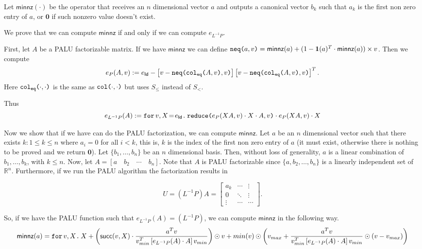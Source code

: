 Let $\mathsf{minnz}(\cdot)$ be the operator that receives an $n$ dimensional vector $a$ and outputs a canonical vector $b_k$ such that $a_k$ is the first non zero entry of $a$, or $\mathbf{0}$ if such nonzero value doesn't exist. 

We prove that we can compute $\mathsf{minnz}$ if and only if we can compute $e_{L^{-1}P}$.

First, let $A$ be a PALU factorizable matrix. If we have $\mathsf{minnz}$ we can define $\nneq{a}{v} = \mathsf{minnz}(a) + (1 - \ones(a)^T\cdot \mathsf{minnz}(a))\times v$.
Then we compute $$e_{P}(A,v) := e_{\mathsf{Id}} - \left[ v - \nneq{ \ccoleq{A}{v} }{v} \right]\left[ v - \nneq{ \ccoleq{A}{v} }{v} \right]^T.$$ Here $\ccoleq{\cdot}{\cdot}$ is the same as $\ccol{\cdot}{\cdot}$ but uses $S_{\leq}$ instead of $S_{<}$.

Thus $$e_{L^{-1}P}(A):=\initf{e_{\mathsf{Id}}}{v}{X}{\red{e_{P}(XA,v)\cdot X\cdot A}{v}\cdot e_{P}(XA,v)\cdot X}$$

Now we show that if we have can do the PALU factorization, we can compute $\mathsf{minnz}$. Let $a$ be an $n$ dimensional vector such that there exists $k:1\leq k\leq n$ where $a_i=0$ for all $i<k$, this is, $k$ is the index of the first non zero entry of $a$ (it must exist, otherwise there is nothing to be proved and we return $\mathbf{0}$). Let $\lbrace b_1, \ldots, b_n\rbrace$ be an $n$ dimensional basis. Then, without loss of generality, $a$ is a linear combination of $b_1, \ldots, b_k$, with $k \leq n$. Now, let $A = \left[ a\hspace{1em} b_2 \hspace{1em} \cdots \hspace{1em}  b_n \right].$ Note that $A$ is PALU factorizable since $\lbrace a, b_2, \ldots, b_n\rbrace$ is a linearly independent set of $\mathbb{R}^n$. Furthermore, if we run the PALU algorithm the factorization results in

\[
U=(L^{-1}P)A = \begin{bmatrix}
    a_k & \cdots &  \vdots \\
    0 & \ddots & \vdots \\
    \vdots & \cdots & \cdots 
\end{bmatrix}.
\]

So, if we have the PALU function such that $e_{L^{-1}P}(A)=(L^{-1}P)$, we can compute $\mathsf{minnz}$ in the following way. $$\mathsf{minnz}(a)=\ffor{v}{X}{X+\left( \mathsf{succ}(v,X)\cdot\dfrac{a^Tv}{v_{min}^T\left[ e_{L^{-1}P}(A)\cdot A\right]v_{min}} \right)\odot v + min(v)\odot\left( v_{max} + \dfrac{a^Tv}{v_{min}^T\left[ e_{L^{-1}P}(A)\cdot A\right]v_{min}}\odot (v-v_{max})\right)}$$

